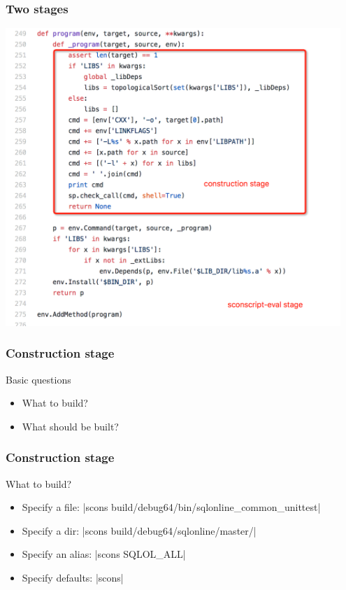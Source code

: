 \documentclass[lualatex]{beamer}
\begin{document}
\begin{frame}
  \frametitle{Two stages}

  \begin{center}
    \includegraphics[width=0.95\textwidth,height=0.85\textheight]{stages.png}
  \end{center}
\end{frame}

\begin{frame}
  \frametitle{Construction stage}

  \begin{block}{Basic questions}
    \begin{itemize}
    \item What to build?
    \item What should be built?
    \end{itemize}
  \end{block}
\end{frame}

\begin{frame}[fragile]
  \frametitle{Construction stage}

  \begin{block}{What to build?}
    \begin{itemize}
    \item Specify a file: |scons build/debug64/bin/sqlonline_common_unittest|
    \item Specify a dir: |scons build/debug64/sqlonline/master/|
    \item Specify an alias: |scons SQLOL_ALL|
    \item Specify defaults: |scons|
    \end{itemize}
  \end{block}
\end{frame}
\end{document}
